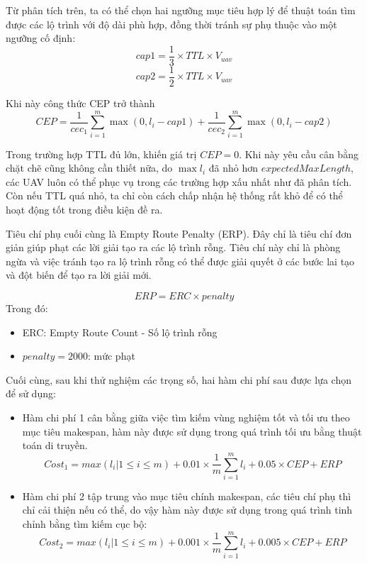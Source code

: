 \documentclass[a4paper]{article}
\begin{document}
Từ phân tích trên, ta có thể chọn hai ngưỡng mục tiêu hợp lý để thuật toán tìm được các lộ trình với độ dài phù hợp, đồng thời tránh sự phụ thuộc vào một ngưỡng cố định:
\begin{equation}
cap1 = \frac 1 3 \times TTL \times V_{uav}
\end{equation}
\begin{equation}
cap2 = \frac 1 2 \times TTL \times V_{uav}
\end{equation}

Khi này công thức CEP trở thành
\begin{equation}
CEP = \frac 1 {cec_1} \sum_{i=1}^{m} \max(0, l_i - cap1) + \frac 1 {cec_2} \sum_{i=1}^{m} \max(0, l_i - cap2)
\end{equation}

Trong trường hợp TTL đủ lớn, khiến giá trị $CEP = 0$. Khi này yêu cầu cân bằng chặt chẽ cũng không cần thiết nữa, do $\max l_i$ đã nhỏ hơn $expectedMaxLength$, các UAV luôn có thể phục vụ trong các trường hợp xấu nhất như đã phân tích. Còn nếu TTL quá nhỏ, ta chỉ còn cách chấp nhận hệ thống rất khỏ để có thể hoạt động tốt trong điều kiện đề ra.

Tiêu chí phụ cuối cùng là Empty Route Penalty (ERP). Đây chỉ là tiêu chí đơn giản giúp phạt các lời giải tạo ra các lộ trình rỗng. Tiêu chí này chỉ là phòng ngừa và việc tránh tạo ra lộ trình rỗng có thể được giải quyết ở các bước lai tạo và đột biến để tạo ra lời giải mới.

\begin{equation}
ERP = ERC \times penalty
\end{equation}
Trong đó:
\begin{itemize}
  \item ERC: Empty Route Count - Số lộ trình rỗng
  \item $penalty=2000$: mức phạt
\end{itemize}

Cuối cùng, sau khi thử nghiệm các trọng số, hai hàm chi phí sau được lựa chọn để sử dụng:
\begin{itemize}
  \item Hàm chi phí 1 cân bằng giữa việc tìm kiếm vùng nghiệm tốt và tối ưu theo mục tiêu makespan, hàm này được sử dụng trong quá trình tối ưu bằng thuật toán di truyền.
  \begin{equation}
    Cost_1 = max(l_i | 1\le i \le m) + 0.01 \times \frac 1m\sum_{i=1}^{m} l_i + 0.05 \times CEP + ERP
  \end{equation}
  \item Hàm chi phí 2 tập trung vào mục tiêu chính makespan, các tiêu chí phụ thì chỉ cải thiện nếu có thể, do vậy hàm này được sử dụng trong quá trình tinh chỉnh bằng tìm kiếm cục bộ:
  \begin{equation}
    Cost_2 = max(l_i | 1\le i \le m) + 0.001 \times \frac 1m\sum_{i=1}^{m} l_i + 0.005 \times CEP + ERP
  \end{equation}
\end{itemize}
\end{document}
